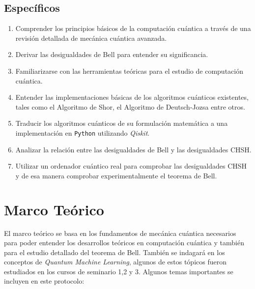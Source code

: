 \documentclass[a4paper]{article}
\begin{document}
\subsection{Específicos}
\begin{enumerate}
\item Comprender los principios básicos de la computación cuántica a través de una revisión detallada de mecánica cuántica avanzada.
\item Derivar las desigualdades de Bell para entender su significancia.
\item Familiarizarse con las herramientas teóricas para el estudio de computación cuántica.
\item Entender las implementaciones básicas de los algoritmos cuánticos existentes, tales como el Algoritmo de Shor, el Algoritmo de Deutsch-Jozsa entre otros.
\item Traducir los algoritmos cuánticos de su formulación matemática a una implementación en \texttt{Python} utilizando \textit{Qiskit}.
\item Analizar la relación entre las desigualdades de Bell y las desigualdades CHSH.
\item Utilizar un ordenador cuántico real para comprobar las desigualdades CHSH y de esa manera comprobar experimentalmente el teorema de Bell.

\end{enumerate}
\section{Marco Teórico}
El marco teórico se basa en los fundamentos de mecánica cuántica necesarios para poder entender los desarrollos teóricos en computación cuántica y también para el estudio detallado del teorema de Bell\cite{Bell}. También se indagará en los conceptos de \textit{Quantum Machine Learning}, algunos de estos tópicos fueron estudiados en los cursos de seminario 1,2 y 3. Algunos temas importantes se incluyen en este protocolo:
\end{document}
